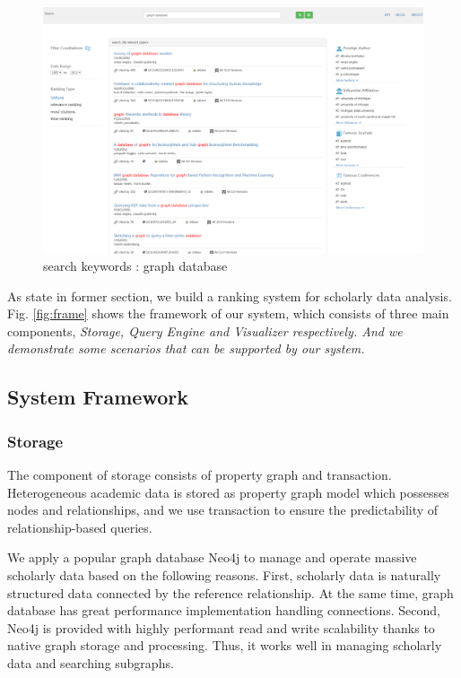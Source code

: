 \begin{figure}[tp]
\centering
\includegraphics[width=\textwidth]{searchKeywords.pdf}
\caption{search keywords : graph database}
\label{fig: search keywords}
\end{figure}

As state in former section, we build a ranking system for scholarly data analysis. Fig. \ref{fig:frame} shows the framework of our system, which consists of three main components, \itshape Storage, Query Engine \upshape and \itshape Visualizer \upshape respectively. And we demonstrate some scenarios that can be supported by our system.

\subsection{System Framework}

\subsubsection{Storage}
\par
The component of storage consists of property graph and transaction. Heterogeneous academic data is stored as property graph model which possesses nodes and relationships, and we use transaction to ensure the predictability of relationship-based queries.

\par
We apply a popular graph database Neo4j \cite{Neo4j} to manage and operate massive scholarly data based on the following reasons. First, scholarly data is naturally structured data connected by the reference relationship. At the same time, graph database has great performance implementation handling connections. Second, Neo4j is provided with highly performant read and write scalability thanks to native graph storage and processing. Thus, it works well in managing scholarly data and searching subgraphs.

